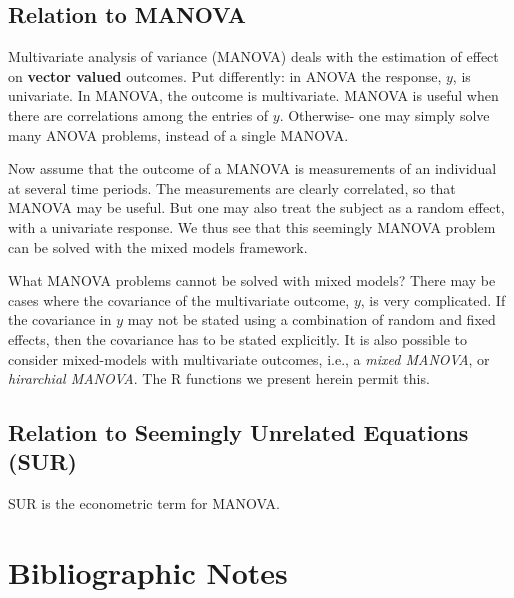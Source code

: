 \documentclass[]{book}
\theoremstyle{definition}
\theoremstyle{definition}
\theoremstyle{definition}
\theoremstyle{remark}
\begin{document}
\subsection{Relation to MANOVA}\label{manova}

Multivariate analysis of variance (MANOVA) deals with the estimation of
effect on \textbf{vector valued} outcomes. Put differently: in ANOVA the
response, \(y\), is univariate. In MANOVA, the outcome is multivariate.
MANOVA is useful when there are correlations among the entries of \(y\).
Otherwise- one may simply solve many ANOVA problems, instead of a single
MANOVA.

Now assume that the outcome of a MANOVA is measurements of an individual
at several time periods. The measurements are clearly correlated, so
that MANOVA may be useful. But one may also treat the subject as a
random effect, with a univariate response. We thus see that this
seemingly MANOVA problem can be solved with the mixed models framework.

What MANOVA problems cannot be solved with mixed models? There may be
cases where the covariance of the multivariate outcome, \(y\), is very
complicated. If the covariance in \(y\) may not be stated using a
combination of random and fixed effects, then the covariance has to be
stated explicitly. It is also possible to consider mixed-models with
multivariate outcomes, i.e., a \emph{mixed MANOVA}, or \emph{hirarchial
MANOVA}. The R functions we present herein permit this.

\subsection{Relation to Seemingly Unrelated Equations
(SUR)}\label{relation-to-seemingly-unrelated-equations-sur}

SUR is the econometric term for MANOVA.

\section{Bibliographic Notes}\label{bibliographic-notes-6}
\end{document}
